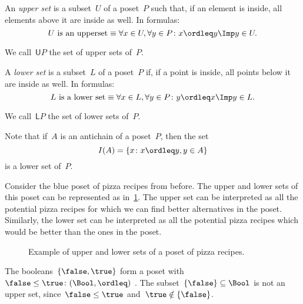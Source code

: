 \begin{definition}
\label{def:upperset}
An \emph{upper set} is a subset~$U$ of a poset~$P$ such
that, if an element is inside, all elements above it are inside as well.
In formulas:
\begin{equation}
\text{$U$ is an upperset} \equiv \forall x\in U, \forall y\in P\colon x\ordleq y \Imp y\in U.
\end{equation}
\end{definition}
\begin{remark}
We call~$\mathsf{U}P$ the set of upper sets of~$P$.
\end{remark}

\begin{definition}
\label{def:lowerset}
A \emph{lower set} is a subset~$L$ of a poset~$P$ if, if a point is inside, all points below it are inside as well. In formulas:
\begin{equation}
\text{$L$ is a lower set} \equiv \forall x\in L, \forall y\in P\colon y\ordleq x \Imp y\in L.
\end{equation}
\end{definition}
\begin{remark}
We call~$\mathsf{L}P$ the set of lower sets of~$P$.
\end{remark}

\begin{remark}
Note that if~$A$ is an antichain of a poset~$P$, then the set
\begin{equation}
    I(A)=\{x\colon x\ordleq y, y\in A\}
\end{equation}
is a lower set of~$P$.
\end{remark}

Consider the blue poset of pizza recipes from before. The upper and lower sets of this poset can be represented as in~\cref{fig:upperset}. The upper set can be interpreted as all the potential pizza recipes for which we can find better alternatives in the poset. Similarly, the lower set can be interpreted as all the potential pizza recipes which would be better than the ones in the poset.

\begin{figure}[h!]
\begin{center}
\end{center}
\caption{Example of upper and lower sets of a poset of pizza recipes. \label{fig:upperset}}
\end{figure}
\begin{example}
The booleans~$\{\false, \true \}$ form a poset with~$\false \leq \true\colon(\Bool,\ordleq)$ . The subset~$\{\false\} \subseteq \Bool$ is not an upper set, since~$\false \leq \true$ and~$\true \notin \{\false \}$.	
\end{example}

